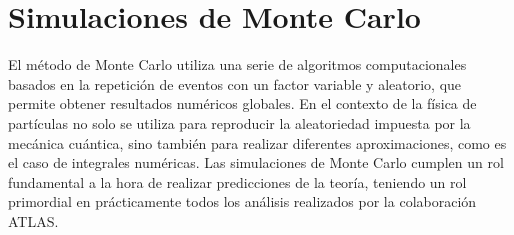 








\section{Simulaciones de Monte Carlo}


El método de Monte Carlo utiliza una serie de algoritmos computacionales basados en la repetición de eventos con un factor variable y aleatorio, que permite obtener resultados numéricos globales.
En el contexto de la física de partículas no solo se utiliza para reproducir la aleatoriedad impuesta por la mecánica cuántica, sino también para realizar diferentes aproximaciones, como es el caso de integrales numéricas.
Las simulaciones de Monte Carlo cumplen un rol fundamental a la hora de realizar predicciones de la teoría, teniendo un rol primordial en prácticamente todos los análisis realizados por la colaboración ATLAS. 


